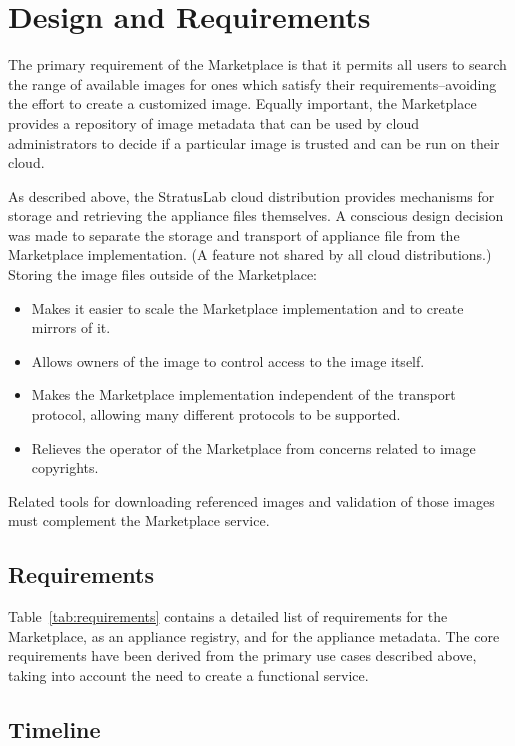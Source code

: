 \section{Design and Requirements}

The primary requirement of the Marketplace is that it permits all
users to search the range of available images for ones which satisfy
their requirements--avoiding the effort to create a customized image.
Equally important, the Marketplace provides a repository of image
metadata that can be used by cloud administrators to decide if a
particular image is trusted and can be run on their cloud.

As described above, the StratusLab cloud distribution provides
mechanisms for storage and retrieving the appliance files themselves.
A conscious design decision was made to separate the storage and
transport of appliance file from the Marketplace implementation.  (A
feature not shared by all cloud distributions.)  Storing the image
files outside of the Marketplace:
\begin{itemize}
\item Makes it easier to scale the Marketplace implementation and to
  create mirrors of it.
\item Allows owners of the image to control access to the image
  itself.
\item Makes the Marketplace implementation independent of the
  transport protocol, allowing many different protocols to be
  supported.
\item Relieves the operator of the Marketplace from concerns related
  to image copyrights.
\end{itemize}
Related tools for downloading referenced images and validation of
those images must complement the Marketplace service.

\subsection{Requirements}

Table~\ref{tab:requirements} contains a detailed list of requirements
for the Marketplace, as an appliance registry, and for the appliance
metadata.  The core requirements have been derived from the primary
use cases described above, taking into account the need to create a
functional service.  

\subsection{Timeline}


